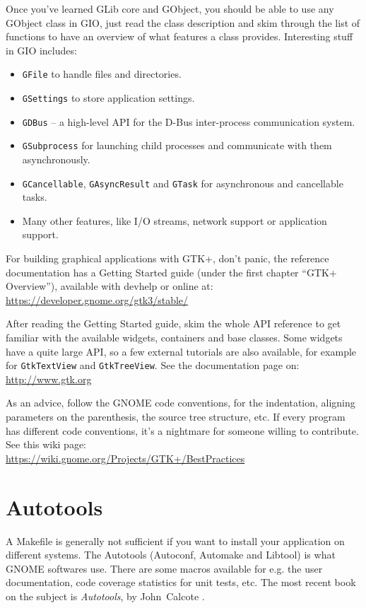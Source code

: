 Once you've learned GLib core and GObject, you should be able to use any GObject class in GIO, just read the class description and skim through the list of functions to have an overview of what features a class provides. Interesting stuff in GIO includes:
\begin{itemize}
  \item \lstinline{GFile} to handle files and directories.
  \item \lstinline{GSettings} to store application settings.
  \item \lstinline{GDBus} -- a high-level API for the D-Bus inter-process communication system.
  \item \lstinline{GSubprocess} for launching child processes and communicate with them asynchronously.
  \item \lstinline{GCancellable}, \lstinline{GAsyncResult} and \lstinline{GTask} for asynchronous and cancellable tasks.
  \item Many other features, like I/O streams, network support or application support.
\end{itemize}

For building graphical applications with GTK+, don't panic, the reference documentation has a Getting Started guide (under the first chapter ``GTK+ Overview''), available with devhelp or online at:\\
\url{https://developer.gnome.org/gtk3/stable/}

After reading the Getting Started guide, skim the whole API reference to get familiar with the available widgets, containers and base classes. Some widgets have a quite large API, so a few external tutorials are also available, for example for \lstinline{GtkTextView} and \lstinline{GtkTreeView}. See the documentation page on:\\
\url{http://www.gtk.org}

As an advice, follow the GNOME code conventions, for the indentation, aligning parameters on the parenthesis, the source tree structure, etc. If every program has different code conventions, it's a nightmare for someone willing to contribute. See this wiki page:\\
\url{https://wiki.gnome.org/Projects/GTK+/BestPractices}

\section{Autotools}

A Makefile is generally not sufficient if you want to install your application on different systems. The Autotools (Autoconf, Automake and Libtool) is what GNOME softwares use. There are some macros available for e.g. the user documentation, code coverage statistics for unit tests, etc. The most recent book on the subject is \emph{Autotools}, by John~Calcote \cite{autotools}.

